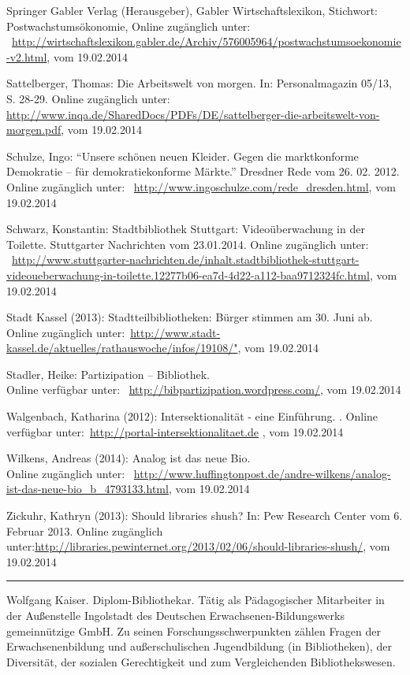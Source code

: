 \documentclass[a4paper,
fontsize=11pt,
oneside,
numbers=noperiodatend,
parskip=half-,
bibliography=totoc,
final
]{scrartcl}
\begin{document}
Springer Gabler Verlag (Herausgeber), Gabler Wirtschaftslexikon,
Stichwort: Postwachstums\-ökonomie, Online zugänglich
unter: \\ ~\url{http://wirtschaftslexikon.gabler.de/Archiv/576005964/postwachstumsoekonomie-v2.html},
vom 19.02.2014

Sattelberger, Thomas: Die Arbeitswelt von morgen. In: Personalmagazin
05/13, S. 28-29. Online zugänglich unter:~
\url{http://www.inqa.de/SharedDocs/PDFs/DE/sattelberger-die-arbeitswelt-von-morgen.pdf},
vom 19.02.2014

Schulze, Ingo: \enquote{Unsere schönen neuen Kleider. Gegen die
marktkonforme Demokratie -- für demokratiekonforme Märkte.} Dresdner
Rede vom 26. 02. 2012. Online zugänglich unter:~
\url{http://www.ingoschulze.com/rede_dresden.html}, vom 19.02.2014

Schwarz, Konstantin: Stadtbibliothek Stuttgart: Videoüberwachung in der
Toilette. Stuttgarter Nachrichten vom 23.01.2014. Online zugänglich
unter: \\ ~\url{http://www.stuttgarter-nachrichten.de/inhalt.stadtbibliothek-stuttgart-videoueberwachung-in-toilette.12277b06-ea7d-4d22-a112-baa9712324fc.html},
vom 19.02.2014

Stadt Kassel (2013): Stadtteilbibliotheken: Bürger stimmen am 30. Juni
ab. Online zugänglich
unter:~\url{http://www.stadt-kassel.de/aktuelles/rathauswoche/infos/19108/"},
vom 19.02.2014

Stadler, Heike: Partizipation -- Bibliothek. \\ Online verfügbar unter:~
\url{http://bibpartizipation.wordpress.com/}, vom 19.02.2014

Walgenbach, Katharina (2012): Intersektionalität - eine Einführung. .
Online verfügbar unter:~\url{http://portal-intersektionalitaet.de} , vom 19.02.2014

Wilkens, Andreas (2014): Analog ist das neue Bio. \\ Online zugänglich
unter:~
\url{http://www.huffingtonpost.de/andre-wilkens/analog-ist-das-neue-bio_b_4793133.html},
vom 19.02.2014

Zickuhr, Kathryn (2013): Should libraries shush? In: Pew Research Center
vom 6. Februar 2013. Online zugänglich
unter:\url{http://libraries.pewinternet.org/2013/02/06/should-libraries-shush/},
vom 19.02.2014

\begin{center}\rule{3in}{0.4pt}\end{center}

Wolfgang Kaiser. Diplom-Bibliothekar. Tätig als Pädagogischer
Mitarbeiter in der Außenstelle Ingolstadt des Deutschen
Erwachsenen-Bildungswerks gemeinnützige GmbH. Zu seinen
Forschungsschwerpunkten zählen Fragen der Erwachsenenbildung und
außerschulischen Jugendbildung (in Bibliotheken), der Diversität, der
sozialen Gerechtigkeit und zum Vergleichenden Bibliothekswesen.
\end{document}
